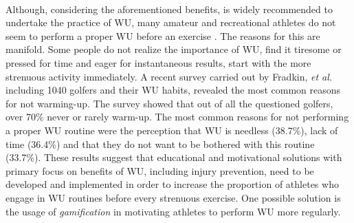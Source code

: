 \\Although, considering the aforementioned benefits, is widely recommended to undertake the practice of WU, many amateur and recreational athletes do not seem to perform a proper WU before an exercise \cite{fradkin2010effects}. The reasons for this are manifold. Some people do not realize the importance of WU, find it tiresome or pressed for time and eager for instantaneous results, start with the more strenuous activity immediately. A recent survey carried out by Fradkin, \textit{et al.} including 1040 golfers and their WU habits, revealed the most common reasons for not warming-up. The survey showed that out of all the questioned golfers, over 70\% never or rarely warm-up. The most common reasons for not performing a proper WU routine were the perception that WU is needless (38.7\%), lack of time (36.4\%) and that they do not want to be bothered with this routine (33.7\%).
These results suggest that educational and motivational solutions with primary focus on benefits of WU, including injury prevention, need to be developed and implemented in order to increase the proportion of athletes who engage in WU routines before every strenuous exercise. One possible solution is the usage of \textit{gamification} in motivating athletes to perform WU more regularly. 

